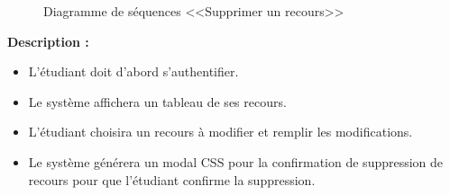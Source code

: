 \documentclass[12pt]{report}
\begin{document}
\newpage

\begin{figure}[h]
\centering
    \centerline{}
    \caption{Diagramme de séquences <<Supprimer un recours>>}
\end{figure}

\vspace{0.2in}

\textbf{Description :}

\begin{itemize}
    \item L'étudiant doit d'abord s'authentifier.
    \item Le système affichera un tableau de ses recours.
    \item L'étudiant choisira un recours à modifier et remplir les modifications.
    \item Le système générera un modal CSS pour la confirmation de suppression de recours pour que l'étudiant confirme la suppression.
\end{itemize}
\end{document}
